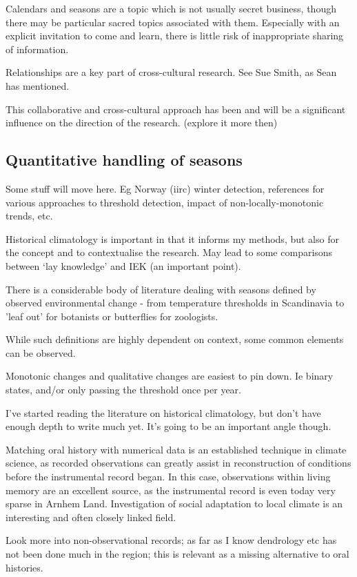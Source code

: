 Calendars and seasons are a topic which is not usually secret business, though
there may be particular sacred topics associated with them.  Especially with an
explicit invitation to come and learn, there is little risk of inappropriate
sharing of information.


Relationships are a key part of cross-cultural research.  See Sue Smith, as
Sean has mentioned.

This collaborative and cross-cultural approach has been and will be a
significant influence on the direction of the research. (explore it more then)



\subsection{Quantitative handling of seasons}

Some stuff will move here.  Eg Norway (iirc) winter detection,
references for various approaches to threshold detection,
impact of non-locally-monotonic trends, etc.

Historical climatology is important in that it informs my methods,
but also for the concept and to contextualise the research.  May lead to
some comparisons between `lay knowledge' and IEK (an important point).


There is a considerable body of literature dealing with seasons defined
by observed environmental change - from temperature thresholds in
Scandinavia to 'leaf out' for botanists or butterflies for zoologists.

While such definitions are highly dependent on context, some common
elements can be observed.

Monotonic changes and qualitative changes are easiest to pin down.
Ie binary states, and/or only passing the threshold once per year.


I've started reading the literature on historical climatology, but don't have
enough depth to write much yet.  It's going to be an important angle though.

Matching oral history with numerical data is an established technique in
climate science, as recorded observations can greatly assist in reconstruction
of conditions before the instrumental record began.  In this case, observations
within living memory are an excellent source, as the instrumental record is
even today very sparse in Arnhem Land.  Investigation of social adaptation to
local climate is an interesting and often closely linked field.

Look more into non-observational records; as far as I know dendrology etc has
not been done much in the region; this is relevant as a missing alternative to
oral histories.

